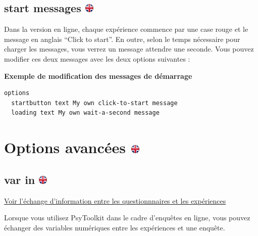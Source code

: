 \documentclass[
]{book}
\begin{document}
\hypertarget{start-messages}{%
\subsection[start messages ]{\texorpdfstring{start messages \href{https://www.psytoolkit.org/doc3.2.0/syntax.html\#options-start-messages}{\protect\includegraphics{img/ukflag.png}}}{start messages }}\label{start-messages}}

Dans la version en ligne, chaque expérience commence par une case rouge et le message en anglais ``Click to start''. En outre, selon le temps nécessaire pour charger les messages, vous verrez un message attendre une seconde. Vous pouvez modifier ces deux messages avec les deux options suivantes :

\textbf{Exemple de modification des messages de démarrage}

\begin{verbatim}
options
  startbutton text My own click-to-start message
  loading text My own wait-a-second message
\end{verbatim}

\hypertarget{options-avancuxe9es}{%
\section[Options avancées ]{\texorpdfstring{Options avancées \href{https://www.psytoolkit.org/doc3.2.0/syntax.html\#advanced_options}{\protect\includegraphics{img/ukflag.png}}}{Options avancées }}\label{options-avancuxe9es}}

\hypertarget{var-in}{%
\subsection[var in ]{\texorpdfstring{var in \href{https://www.psytoolkit.org/doc3.2.0/syntax.html\#_var_in}{\protect\includegraphics{img/ukflag.png}}}{var in }}\label{var-in}}

\protect\hyperlink{s11}{Voir l'échange d'information entre les questionnnaires et les expériences}

Lorsque vous utilisez PsyToolkit dans le cadre d'enquêtes en ligne, vous pouvez échanger des variables numériques entre les expériences et une enquête.
\end{document}
